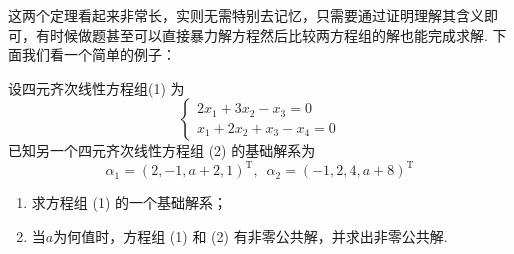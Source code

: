 这两个定理看起来非常长，实则无需特别去记忆，只需要通过证明理解其含义即可，有时候做题甚至可以直接暴力解方程然后比较两方程组的解也能完成求解. 下面我们看一个简单的例子：
\begin{example}
    设四元齐次线性方程组(1) 为\[\begin{cases}
            2x_1+3x_2-x_3=0 \\ x_1+2x_2+x_3-x_4=0
        \end{cases}\]已知另一个四元齐次线性方程组 (2) 的基础解系为
    \[\alpha_1=(2,-1,a+2,1)^\mathrm{T},\enspace\alpha_2=(-1,2,4,a+8)^\mathrm{T}\]
    \begin{enumerate}
        \item 求方程组 (1) 的一个基础解系；

        \item 当$a$为何值时，方程组 (1) 和 (2) 有非零公共解，并求出非零公共解.
    \end{enumerate}
\end{example}

